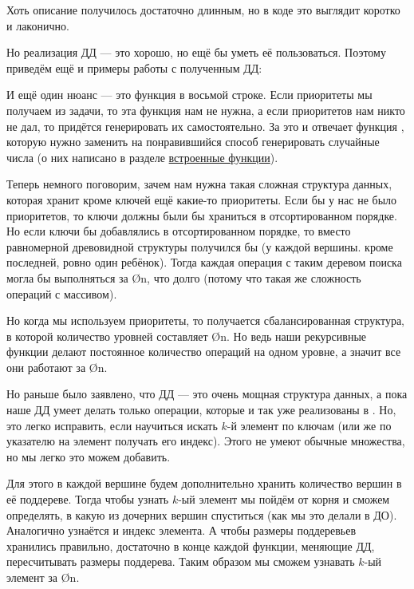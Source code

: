 Хоть описание получилось достаточно длинным, но в коде это выглядит коротко и лаконично.


Но реализация ДД — это хорошо, но ещё бы уметь её пользоваться. Поэтому приведём ещё и примеры работы с полученным ДД:


И ещё один нюанс — это функция  в восьмой строке. Если приоритеты мы получаем из задачи, то эта функция нам не нужна, а если приоритетов нам никто не дал, то придётся генерировать их самостоятельно. За это и отвечает функция , которую нужно заменить на понравившийся способ генерировать случайные числа (о них написано в разделе \hyperlink{built-in function}{встроенные функции}).

Теперь немного поговорим, зачем нам нужна такая сложная структура данных, которая хранит кроме ключей ещё какие-то приоритеты. Если бы у нас не было приоритетов, то ключи должны были бы храниться в отсортированном порядке. Но если ключи бы добавлялись в отсортированном порядке, то вместо равномерной древовидной структуры получился бы  (у каждой вершины. кроме последней, ровно один ребёнок). Тогда каждая операция с таким деревом поиска могла бы выполняться за \O{n}, что долго (потому что такая же сложность операций с массивом).

Но когда мы используем приоритеты, то получается сбалансированная структура, в которой количество уровней составляет \O{\log n}. Но ведь наши рекурсивные функции делают постоянное количество операций на одном уровне, а значит все они работают за \O{\log n}.

Но раньше было заявлено, что ДД — это очень мощная структура данных, а пока наше ДД умеет делать только операции, которые и так уже реализованы в . Но, это легко исправить, если научиться искать $k$-й элемент по ключам (или же по указателю на элемент получать его индекс). Этого не умеют обычные множества, но мы легко это можем добавить.

Для этого в каждой вершине будем дополнительно хранить количество вершин в её поддереве. Тогда чтобы узнать $k$-ый элемент мы пойдём от корня и сможем определять, в какую из дочерних вершин спуститься (как мы это делали в ДО). Аналогично узнаётся и индекс элемента. А чтобы размеры поддеревьев хранились правильно, достаточно в конце каждой функции, меняющие ДД, пересчитывать размеры поддерева. Таким образом мы сможем узнавать $k$-ый элемент за \O{\log n}.

